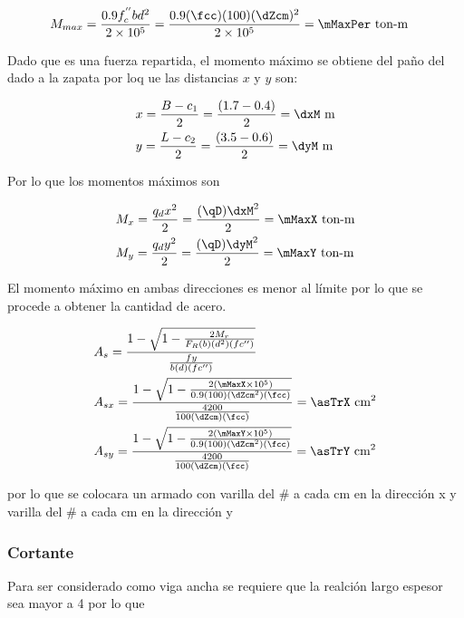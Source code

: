 \documentclass[11pt,a4paper,fleqn]{article}
\begin{document}
\begin{align*}
	&M_{max}=\frac{0.9f^{''}_c b d^2}{2\times 10^5}=\frac{0.9(\fcc)( 100)( \dZcm)^2}{2\times 10^5}= \mMaxPer \text{ ton-m}
\end{align*}

Dado que es una fuerza repartida, el momento máximo se obtiene del paño del dado a la zapata por loq ue las distancias $x$ y $y$ son:

\begin{align*}
	&x=\frac{B-c_1}{2}=\frac{(\bZ-\caZ)}{2}= \dxM \text{ m} \\
	&y=\frac{L-c_2}{2}=\frac{(\lZ-\cbZ)}{2}= \dyM \text{ m} 
\end{align*}

Por lo que los momentos máximos son

\begin{align*}
	&M_x=\frac{q_d x^2}{2}=\frac{(\qD)\dxM^2}{2}= \mMaxX \text{ ton-m} \\
	&M_y=\frac{q_d y^2}{2}=\frac{(\qD)\dyM^2}{2}= \mMaxY \text{ ton-m} 
\end{align*}

El momento máximo en ambas direcciones es menor al límite por lo que se procede a obtener la cantidad de acero.


\begin{align*}
	&A_s=\frac{1-\sqrt{1-\frac{2M_r}{F_R(b)(d^2)(fc'')}}}{\frac{fy}{b(d)(fc'')}}\\
	&A_{sx}=\frac{1-\sqrt{1-\frac{2(\mMaxX\times 10^5)}{0.9(100)(\dZcm^2)(\fcc)}}}{\frac{\fy}{100(\dZcm)(\fcc)}}=\asTrX \text{ cm$^2$}\\
	&A_{sy}=\frac{1-\sqrt{1-\frac{2(\mMaxY\times 10^5)}{0.9(100)(\dZcm^2)(\fcc)}}}{\frac{\fy}{100(\dZcm)(\fcc)}}=\asTrY \text{ cm$^2$}
\end {align*}

por lo que se colocara un armado con varilla del \# \VarX \; a cada \distVarX \;cm en la dirección x y varilla del \# \VarY \;a cada \distVarY \;cm en la dirección y

\subsubsection{Cortante}
Para ser considerado como viga ancha se requiere que la realción largo espesor sea mayor a 4 por lo que 
\end{document}
